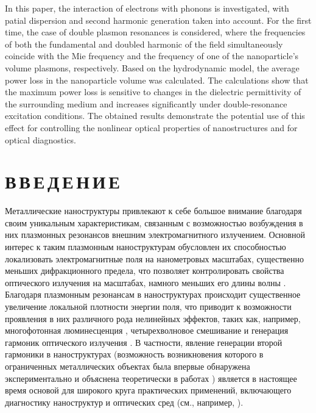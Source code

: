 \documentclass[12pt, a4paper]{article}
\begin{document}
In this paper, the interaction of electrons with phonons is investigated, with  patial dispersion and second harmonic generation taken into account.
For the first time, the case of double plasmon resonances is considered, where the frequencies of both the fundamental and doubled harmonic of the field simultaneously coincide with the Mie frequency and the frequency of one of the nanoparticle's volume plasmons, respectively.
Based on the hydrodynamic model, the average power loss in the nanoparticle volume was calculated.
The calculations show that the maximum power loss is sensitive to changes in the dielectric permittivity of the surrounding medium and increases significantly under double-resonance excitation conditions.
The obtained results demonstrate the potential use of this effect for controlling the nonlinear optical properties of nanostructures and for optical diagnostics.\\



\newpage

\section*{В\,В\,Е\,Д\,Е\,Н\,И\,Е}

Металлические наноструктуры привлекают к себе большое внимание благодаря своим уникальным характеристикам, связанным с возможностью возбуждения в них плазмонных резонансов внешним электромагнитного излучением.
Основной интерес к таким плазмонным наноструктурам обусловлен их способностью локализовать электромагнитные поля на нанометровых масштабах, существенно меньших дифракционного предела, что позволяет контролировать свойства оптического излучения на масштабах, намного меньших его длины волны \cite{Mai2007, Gram2010}.
Благодаря плазмонным резонансам в наноструктурах происходит существенное увеличение локальной плотности энергии поля, что приводит к возможности проявления в них различного рода нелинейных эффектов, таких как, например, многофотонная люминесценция \cite{Cas2011,biagioni2012,chen2021, ko2011}, четырехволновое смешивание \cite{danckwerts2007, harutyunyan2012,Li2016, paspalakis2014, singh2016} и генерация гармоник оптического излучения \cite{drobyh2020, smirnova2014, TorresTorres2010}.
В частности, явление генерации второй гармоники в наноструктурах  (возможность возникновения которого в ограниченных металлических объектах была впервые обнаружена экспериментально и объяснена теоретически в работах \cite{franken1961, Bloembergen1962}) является в настоящее время основой для широкого круга практических применений, включающего диагностику наноструктур и оптических сред (см., например, \cite{butet2015, Butet2012}).
\end{document}
